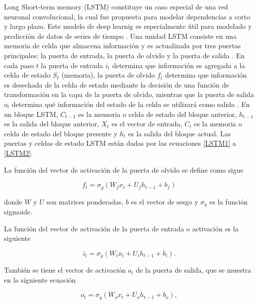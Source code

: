 Long Short-term memory (LSTM) constituye un caso especial de una red neuronal convolucional, la cual fue propuesta para modelar dependencias a corto y largo plazo. Este modelo de deep learnig es especialmente útil para modelado y predicción de datos de series de tiempo \parencite{mudassirTimeseriesForecastingBitcoin2020}.
Una unidad LSTM consiste en una memoria de celda que almacena información y es actualizada por tres puertas principales: la puerta de entrada, la puerta de olvido y la puerta de salida \parencite{chenBitcoinPricePrediction2020}.
En cada paso $t$ la puerta de entrada $i_t$ determina que información es agregada a la celda de estado $S_t$ (memoria), la puerta de olvido $f_t$ determina que información es desechada de la celda de estado mediante la decisión de una función de transformación en la capa de la puerta de olvido, mientras que la puerta de salida $o_t$ determina qué información del estado de la celda se utilizará como salida \parencite{livierisEnsembleDeepLearning2020}.
En un bloque LSTM, $C_{t-1}$ es la memoria o celda de estado del bloque anterior, $h_{t-1}$ es la salida del bloque anterior, $X_t$ es el vector de entrada, $C_t$  es la memoria o celda de estado del bloque presente y  $h_{t}$ es la salida del bloque actual.
Las puertas y celdas de estado LSTM están dadas por las ecuaciones \ref{LSTM1} a \ref{LSTM2}.

La función del vector de activación de la puerta de olvido se define como sigue

\begin{equation}
	f_{t}=\sigma_{g}\left(W_{f} x_{t}+U_{f} h_{t-1}+b_{f}\right)
	\label{LSTM1}
\end{equation}

donde $W$ y $U$ son matrices ponderadas, $b$ es el vector de sesgo y $\sigma_{g}$ es la función sigmoide. 

La función del vector de activación de la puerta de entrada o activación es la siguiente

\begin{equation}
	i_{t}=\sigma_{g}\left(W_{i} x_{t}+U_{i} h_{t-1}+b_{i}\right).
\end{equation}

También se tiene el vector de activación $o_t$ de la puerta de salida, que se muestra en la siguiente ecuación

\begin{equation}
	o_{t}=\sigma_{g}\left(W_{o} x_{t}+U_{o} h_{t-1}+b_{o}\right),
\end{equation}

